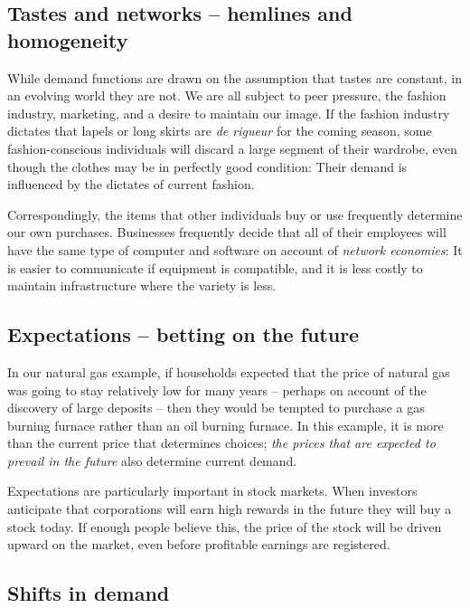 \subsection*{Tastes and networks -- hemlines and homogeneity}

While demand functions are drawn on the assumption that tastes are constant,
in an evolving world they are not. We are all subject to peer pressure, the
fashion industry, marketing, and a desire to maintain our image. If the
fashion industry dictates that lapels or long skirts are \textit{de rigueur}
for the coming season, some fashion-conscious individuals will discard a
large segment of their wardrobe, even though the clothes may be in perfectly
good condition: Their demand is influenced by the dictates of current
fashion.

Correspondingly, the items that other individuals buy or use frequently
determine our own purchases. Businesses frequently decide that all of their
employees will have the same type of computer and software on account of 
\textit{network economies}: It is easier to communicate if equipment is
compatible, and it is less costly to maintain infrastructure where the
variety is less.

\subsection*{Expectations -- betting on the future}

In our natural gas example, if households expected that the price of natural
gas was going to stay relatively low for many years -- perhaps on account of
the discovery of large deposits -- then they would be tempted to purchase a
gas burning furnace rather than an oil burning furnace. In this example, it
is more than the current price that determines choices; \textit{the prices
that are expected to prevail in the future} also determine current demand.

Expectations are particularly important in stock markets. When investors
anticipate that corporations will earn high rewards in the future they will
buy a stock today. If enough people believe this, the price of the stock
will be driven upward on the market, even before profitable earnings are
registered.

\newhtmlpage

\subsection*{Shifts in demand}

